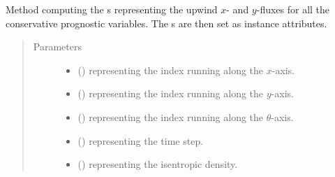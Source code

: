 \documentclass[letterpaper,10pt,english]{sphinxmanual}
\begin{document}
\begin{fulllineitems}
\begin{fulllineitems}
\begin{quote}
\begin{description}
\begin{itemize}
\end{itemize}

\end{description}\end{quote}

\end{fulllineitems}


\begin{fulllineitems}
\label{\detokenize{api:tasmania.dycore.flux_isentropic_upwind.FluxIsentropicUpwind._compute_horizontal_fluxes}}
Method computing the s representing the upwind \(x\)-
and \(y\)-fluxes for all the conservative prognostic variables.
The s are then set as instance attributes.
\begin{quote}\begin{description}
\item[{Parameters}] \leavevmode\begin{itemize}
\item {} 
 () \textendash{}  representing the index running along the \(x\)-axis.

\item {} 
 () \textendash{}  representing the index running along the \(y\)-axis.

\item {} 
 () \textendash{}  representing the index running along the \(\theta\)-axis.

\item {} 
 () \textendash{}  representing the time step.

\item {} 
 () \textendash{}  representing the isentropic density.


\end{itemize}
\end{description}
\end{quote}
\end{fulllineitems}
\end{fulllineitems}
\end{document}
